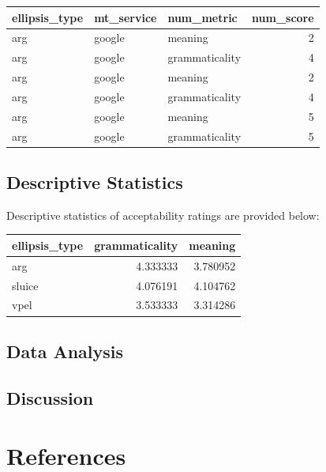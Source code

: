 \documentclass[
  man,floatsintext]{apa6}
\newlength{\cslhangindent}
\newlength{\cslentryspacingunit} %
\newenvironment{CSLReferences}[2] %
 {%
  \setlength{\parindent}{0pt}
  \ifodd #1
  \let\oldpar\par
  \def\par{\hangindent=\cslhangindent\oldpar}
  \fi
  \setlength{\parskip}{#2\cslentryspacingunit}
 }%
 {}
\begin{document}
\begin{tabular}{l|l|l|r}
\hline
ellipsis\_type & mt\_service & num\_metric & num\_score\\
\hline
arg & google & meaning & 2\\
\hline
arg & google & grammaticality & 4\\
\hline
arg & google & meaning & 2\\
\hline
arg & google & grammaticality & 4\\
\hline
arg & google & meaning & 5\\
\hline
arg & google & grammaticality & 5\\
\hline
\end{tabular}

\hypertarget{descriptive-statistics}{%
\subsection{Descriptive Statistics}\label{descriptive-statistics}}

Descriptive statistics of acceptability ratings are provided below:

\begin{tabular}{l|r|r}
\hline
ellipsis\_type & grammaticality & meaning\\
\hline
arg & 4.333333 & 3.780952\\
\hline
sluice & 4.076191 & 4.104762\\
\hline
vpel & 3.533333 & 3.314286\\
\hline
\end{tabular}

\hypertarget{data-analysis}{%
\subsection{Data Analysis}\label{data-analysis}}

\hypertarget{discussion}{%
\subsection{Discussion}\label{discussion}}

\newpage

\hypertarget{references}{%
\section{References}\label{references}}

\hypertarget{refs}{}
\begin{CSLReferences}{0}{0}
\end{CSLReferences}
\end{document}
